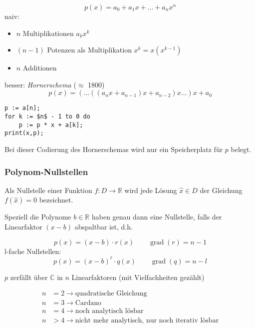 \begin{equation*}
	p(x)=a_0+a_1x+\ldots+a_nx^n
\end{equation*}
naiv:
\begin{itemize}
	\item \( n \) Multiplikationen \( a_kx^k \)
	\item \( (n-1) \) Potenzen als Multiplikation \( x^k=x(x^{k-1}) \)
	\item \( n \) Additionen
\end{itemize}
%
besser: \emph{Hornerschema} (\( \approx \) 1800)
\[
	p(x)=(\ldots((a_nx+a_{n-1})x+a_{n-2})x\ldots)x+a_0
\]


\begin{lstlisting}[caption="`Codierung des Hornerschemas"'] 
p := a[n];
for k := $n$ - 1 to 0 do
	p := p * x + a[k];
print(x,p);
\end{lstlisting}
Bei dieser Codierung des Hornerschemas wird nur ein Speicherplatz für \( p \) belegt.


\subsubsection*{Polynom-Nullstellen} %
\label{ssub:polynom_nullstellen}

\begin{definition}
				Als Nullstelle einer Funktion \( f:D\rightarrow\mathbb{R} \) wird jede Lösung \( \widehat{x} \in D \) der Gleichung \( f(\widehat{x})=0 \) bezeichnet.
\end{definition}
\noindent Speziell die Polynome \( b \in \mathbb{R} \) haben genau dann eine Nullstelle, falls der Linearfaktor \( (x-b) \) abspaltbar ist, d.h.

\[
	p(x)=(x-b) \cdot r(x) \qquad \operatorname{grad}(r)=n-1
\]
l-fache Nullstellen:
\[
	p(x)=(x-b)^\ell \cdot q(x) \qquad \operatorname{grad}(q)=n-l
\]
\begin{theorem}
	$p$ zerfällt über \( \mathbb{C} \) in $n$ Linearfaktoren (mit Vielfachheiten gezählt)
\end{theorem}

\begin{note}
\begin{align*}
	n &= 2 \rightarrow \text{quadratische Gleichung} \\
	n &= 3 \rightarrow \text{Cardano} \\
	n &= 4 \rightarrow \text{noch analytisch lösbar} \\
	n &> 4 \rightarrow \text{nicht mehr analytisch, nur noch iterativ lösbar}
\end{align*}
\end{note}


